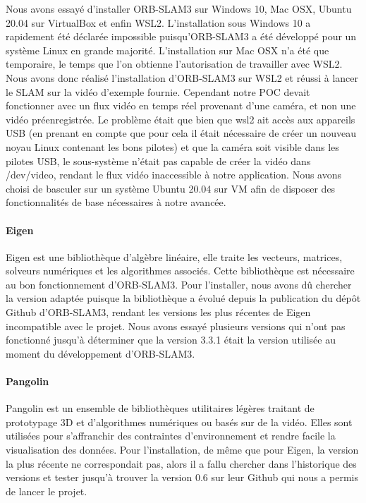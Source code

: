 \documentclass[11pt]{article}
\begin{document}
          Nous avons essayé d'installer ORB-SLAM3 sur Windows 10, Mac OSX, Ubuntu 20.04 sur VirtualBox et enfin 
          WSL2. L'installation sous Windows 10 a rapidement été déclarée impossible puisqu'ORB-SLAM3
          a été développé pour un système Linux en grande majorité. L'installation sur Mac OSX n'a été que temporaire, le temps que l'on 
          obtienne l'autorisation de travailler avec WSL2.
          Nous avons donc réalisé l'installation d'ORB-SLAM3 sur WSL2 et réussi à lancer le SLAM
          sur la vidéo d'exemple fournie. Cependant notre POC devait fonctionner avec un flux vidéo en temps réel provenant
          d'une caméra, et non une vidéo préenregistrée. Le problème était que bien que wsl2 ait accès aux appareils USB (en prenant en compte 
          que pour cela il était nécessaire de créer un nouveau noyau Linux contenant les bons pilotes) et que la caméra soit visible dans les
          pilotes USB, le sous-système n'était pas capable de créer la vidéo dans /dev/video, rendant le flux vidéo inaccessible à notre
          application. Nous avons choisi de basculer sur un système Ubuntu 20.04 sur VM afin de disposer des fonctionnalités de base
          nécessaires à notre avancée.     

        \paragraph{Eigen}
          Eigen est une bibliothèque d'algèbre linéaire, elle traite les vecteurs, matrices, solveurs numériques et les algorithmes
          associés. Cette bibliothèque est nécessaire au bon fonctionnement d'ORB-SLAM3. Pour l'installer, nous avons dû chercher la version 
          adaptée puisque la bibliothèque a évolué depuis la publication du dépôt Github d'ORB-SLAM3, rendant les versions les plus récentes
          de Eigen incompatible avec le projet. Nous avons essayé plusieurs versions qui n'ont pas fonctionné jusqu'à déterminer que la version 
          3.3.1 était la version utilisée au moment du développement d'ORB-SLAM3.

        \paragraph{Pangolin}
          Pangolin est un ensemble de bibliothèques utilitaires légères traitant de prototypage 3D et d'algorithmes numériques 
          ou basés sur de la vidéo. Elles sont utilisées pour s'affranchir des contraintes d'environnement et rendre facile la visualisation des 
          données. Pour l'installation, de même que pour Eigen, la version la plus récente ne correspondait pas, alors il a fallu chercher dans 
          l'historique des versions et tester jusqu'à trouver la version 0.6 sur leur Github qui nous a permis de lancer le projet.
\end{document}

